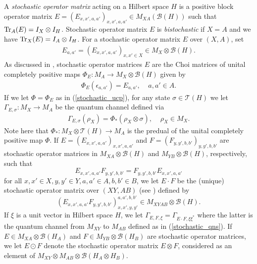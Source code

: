 \documentclass[11pt]{amsart}
\newcommand{\cl}[1]{\mathcal{#1}}
\begin{document}
A \emph{stochastic operator matrix} acting on a Hilbert space $H$ 
is a positive block operator matrix $E = (E_{x, x', a, a'})_{x, x', a, a'} \in M_{XA}(\cl{B}(H))$ such that 
${\rm Tr}_{A}(E) = I_{X} \otimes I_{H}$. Stochastic operator matrix $E$ is \textit{bistochastic} \cite{bhtt} if $X = A$ and we have ${\rm Tr}_{X}(E) = I_{A}\otimes I_{H}$. For a stochastic operator matrix $E$ over $(X, A)$, set
\begin{gather*}
	E_{a, a'} = (E_{x, x', a, a'})_{x, x' \in X} \in M_{X}\otimes \cl{B}(H).
\end{gather*}
\noindent As discussed in \cite[Section 3]{tt}, stochastic operator matrices $E$ are the Choi matrices of unital completely positive maps $\Phi_{E}: M_{A}\rightarrow M_{X}\otimes \cl{B}(H)$ given by
\begin{gather}\label{stochastic_ucp}
	\Phi_{E}(\epsilon_{a, a'}) = E_{a, a'}, \;\;\;\; a, a' \in A.
\end{gather}
\noindent If we let $\Phi = \Phi_{E}$ as in (\ref{stochastic_ucp}), for any state $\sigma \in \cl{T}(H)$ we let $\Gamma_{E, \sigma}: M_{X}\rightarrow M_{A}$ be the quantum channel defined via
\begin{gather}\label{stochastic_qns}
	\Gamma_{E, \sigma}(\rho_{X}) = \Phi_{*}(\rho_{X}\otimes \sigma), \;\;\;\; \rho_{X} \in M_{X}.
\end{gather}
\noindent Note here that $\Phi_{*}: M_{X}\otimes \cl{T}(H)\rightarrow M_{A}$ is the predual of the unital completely positive map $\Phi$. If $E = (E_{x, x', a, a'})_{x, x', a, a'}$ and $F = (F_{y, y', b, b'})_{y, y', b, b'}$ are stochastic operator matrices in $M_{XA}\otimes \cl{B}(H)$ and $M_{YB}\otimes \cl{B}(H)$, respectively, such that 
$$E_{x, x', a, a'}F_{y, y', b, b'} = F_{y, y', b, b'}E_{x, x', a, a'}$$
for all $x, x' \in X, y, y' \in Y, a, a' \in A, b, b' \in B$, we let $E \cdot F$ be the (unique) stochastic operator matrix over $(XY, AB)$ (see \cite[Proposition 4.1]{tt}) defined by
$$ (E_{x, x', a, a'}F_{y, y', b, b'})_{x, x', y, y'}^{a, a', b, b'} \in M_{XYAB}\otimes \cl{B}(H).$$ 
If $\xi$ is a unit vector in Hilbert space $H$, we let $\Gamma_{E, F, \xi} = \Gamma_{E\cdot F, \xi\xi^{*}}$ where the latter is the quantum channel from $M_{XY}$ to $M_{AB}$ defined as in (\ref{stochastic_qns}). If $E \in M_{XA}\otimes \cl{B}(H_{A})$ and $F \in M_{YB}\otimes \cl{B}(H_{B})$ are stochastic operator matrices, we let $E\odot F$ denote the stochastic operator matrix $E\otimes F$, considered as an element of $M_{XY}\otimes M_{AB}\otimes \cl{B}(H_{A}\otimes H_{B})$. 
\end{document}
